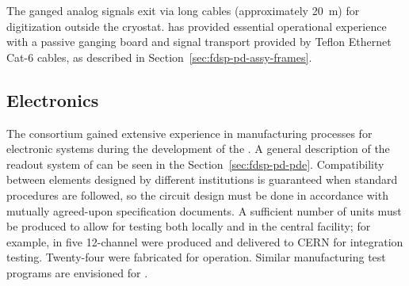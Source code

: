 
The ganged analog signals exit via long cables (approximately \SI{20}{m}) for digitization outside the cryostat.
 has provided essential operational experience with a passive ganging board and signal transport provided by Teflon Ethernet Cat-6 cables, as described in Section~\ref{sec:fdsp-pd-assy-frames}.


\subsection{Electronics}
\label{sec:fdsp-pd-assy-pde}

The  consortium gained extensive experience in manufacturing processes for electronic systems during the development of the  .
A general description of the readout system of  can be seen in the Section~\ref{sec:fdsp-pd-pde}. Compatibility between elements designed by different institutions is guaranteed when standard procedures are followed, so the circuit design must be done in accordance with mutually agreed-upon specification documents.  A sufficient  number of units must be produced to allow %
for testing both locally and  in the central facility; for example, in  five 12-channel   were produced and delivered to CERN for integration testing. Twenty-four were fabricated for  operation. Similar manufacturing test programs are envisioned for .


